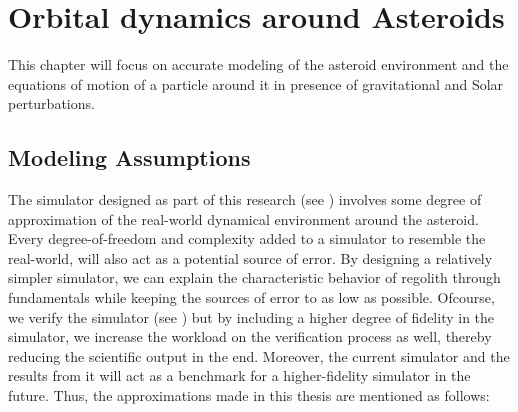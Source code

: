 \chapter{Orbital dynamics around Asteroids}
\label{chap:dynamics_modeling}
\graphicspath{{Modeling/Images/}}

This chapter will focus on accurate modeling of the asteroid environment and the equations of motion of a particle around it in presence of gravitational and Solar perturbations.

\section{Modeling Assumptions}
\label{sec:assumptions}
The simulator designed as part of this research (see ) involves some degree of approximation of the real-world dynamical environment around the asteroid. Every degree-of-freedom and complexity added to a simulator to resemble the real-world, will also act as a potential source of error. By designing a relatively simpler simulator, we can explain the characteristic behavior of regolith through fundamentals while keeping the sources of error to as low as possible. Ofcourse, we verify the simulator (see ) but by including a higher degree of fidelity in the simulator, we increase the workload on the verification process as well, thereby reducing the scientific output in the end. Moreover, the current simulator and the results from it will act as a benchmark for a higher-fidelity simulator in the future. Thus, the approximations made in this thesis are mentioned as follows:

